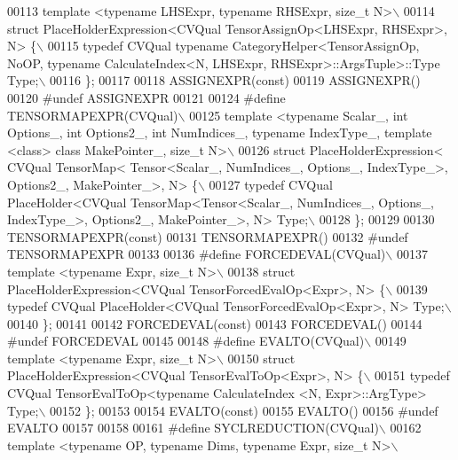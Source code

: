 \begin{DoxyCode}
00113 \textcolor{preprocessor}{template <typename LHSExpr, typename RHSExpr, size\_t N>\(\backslash\)}
00114 \textcolor{preprocessor}{struct PlaceHolderExpression<CVQual TensorAssignOp<LHSExpr, RHSExpr>, N> \{\(\backslash\)}
00115 \textcolor{preprocessor}{  typedef CVQual typename CategoryHelper<TensorAssignOp, NoOP, typename CalculateIndex<N, LHSExpr,
       RHSExpr>::ArgsTuple>::Type Type;\(\backslash\)}
00116 \textcolor{preprocessor}{\};}
00117 
00118 ASSIGNEXPR(\textcolor{keyword}{const})
00119 ASSIGNEXPR()
00120 \textcolor{preprocessor}{#undef ASSIGNEXPR}
00121 
00124 \textcolor{preprocessor}{#define TENSORMAPEXPR(CVQual)\(\backslash\)}
00125 \textcolor{preprocessor}{template <typename Scalar\_, int Options\_, int Options2\_, int NumIndices\_, typename IndexType\_, template
       <class> class MakePointer\_, size\_t N>\(\backslash\)}
00126 \textcolor{preprocessor}{struct PlaceHolderExpression< CVQual TensorMap< Tensor<Scalar\_, NumIndices\_, Options\_, IndexType\_>,
       Options2\_, MakePointer\_>, N> \{\(\backslash\)}
00127 \textcolor{preprocessor}{  typedef CVQual PlaceHolder<CVQual TensorMap<Tensor<Scalar\_, NumIndices\_, Options\_, IndexType\_>,
       Options2\_, MakePointer\_>, N> Type;\(\backslash\)}
00128 \textcolor{preprocessor}{\};}
00129 
00130 TENSORMAPEXPR(\textcolor{keyword}{const})
00131 TENSORMAPEXPR()
00132 \textcolor{preprocessor}{#undef TENSORMAPEXPR}
00133 
00136 \textcolor{preprocessor}{#define FORCEDEVAL(CVQual)\(\backslash\)}
00137 \textcolor{preprocessor}{template <typename Expr, size\_t N>\(\backslash\)}
00138 \textcolor{preprocessor}{struct PlaceHolderExpression<CVQual TensorForcedEvalOp<Expr>, N> \{\(\backslash\)}
00139 \textcolor{preprocessor}{  typedef CVQual PlaceHolder<CVQual TensorForcedEvalOp<Expr>, N> Type;\(\backslash\)}
00140 \textcolor{preprocessor}{\};}
00141 
00142 FORCEDEVAL(\textcolor{keyword}{const})
00143 FORCEDEVAL()
00144 \textcolor{preprocessor}{#undef FORCEDEVAL}
00145 
00148 \textcolor{preprocessor}{#define EVALTO(CVQual)\(\backslash\)}
00149 \textcolor{preprocessor}{template <typename Expr, size\_t N>\(\backslash\)}
00150 \textcolor{preprocessor}{struct PlaceHolderExpression<CVQual TensorEvalToOp<Expr>, N> \{\(\backslash\)}
00151 \textcolor{preprocessor}{  typedef CVQual TensorEvalToOp<typename CalculateIndex <N, Expr>::ArgType> Type;\(\backslash\)}
00152 \textcolor{preprocessor}{\};}
00153 
00154 EVALTO(\textcolor{keyword}{const})
00155 EVALTO()
00156 \textcolor{preprocessor}{#undef EVALTO}
00157 
00158 
00161 \textcolor{preprocessor}{#define SYCLREDUCTION(CVQual)\(\backslash\)}
00162 \textcolor{preprocessor}{template <typename OP, typename Dims, typename Expr, size\_t N>\(\backslash\)}

\end{DoxyCode}
